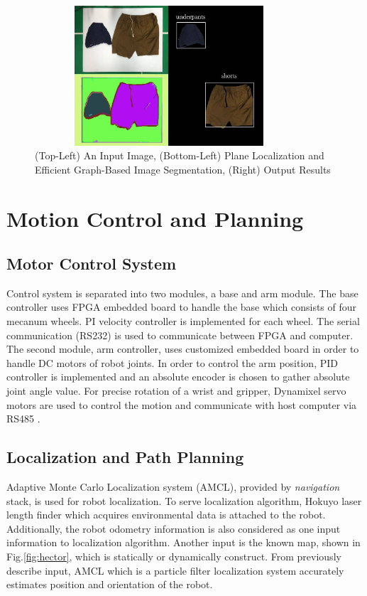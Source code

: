 \documentclass{llncs}
\begin{document}
\begin{figure}
\centering
\includegraphics[width=10cm,height=5.2cm]{ClothType}
\caption{(Top-Left) An Input Image, (Bottom-Left) Plane Localization and Efficient Graph-Based Image Segmentation, (Right) Output Results}
\label{fig:clothtype}
\end{figure} 

\section{Motion Control and Planning}

\subsection{Motor Control System}

Control system is separated into two modules, a base and arm module. The base controller uses FPGA embedded board to handle the base which consists of four mecanum wheels. PI velocity controller is implemented for each wheel. The serial communication (RS232) is used to communicate between FPGA and computer. The second module, arm controller, uses customized embedded board in order to handle DC motors of robot joints. In order to control the arm position, PID controller is implemented and an absolute encoder is chosen to gather absolute joint angle value. For precise rotation of a wrist and gripper, Dynamixel servo motors are used to control the motion and communicate with host computer via RS485 \cite{con_arm}.

\subsection{Localization and Path Planning}

Adaptive Monte Carlo Localization system (AMCL), provided by \textit{navigation} stack, is used for robot localization. To serve localization algorithm, Hokuyo laser length finder which acquires environmental data is attached to the robot. Additionally, the robot odometry information is also considered as one input information to localization algorithm. Another input is the known map, shown in Fig.\ref{fig:hector}, which is statically or dynamically construct. From previously describe input, AMCL which is a particle filter localization system accurately estimates position and orientation of the robot.
\end{document}

